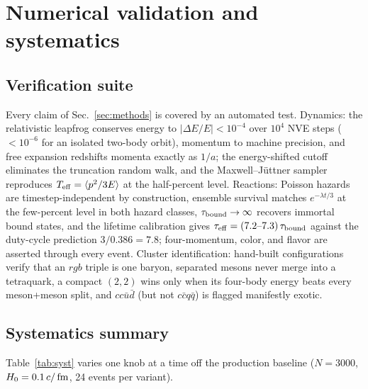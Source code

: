 \section{Numerical validation and systematics}
\label{app:validation}

\subsection{Verification suite}

Every claim of Sec.~\ref{sec:methods} is covered by an automated test.
Dynamics: the relativistic leapfrog conserves energy to
$|\Delta E/E|<10^{-4}$ over $10^4$ NVE steps ($<10^{-6}$ for an
isolated two-body orbit), momentum to machine precision, and free
expansion redshifts momenta exactly as $1/a$; the energy-shifted
cutoff eliminates the truncation random walk, and the
Maxwell--J\"uttner sampler reproduces $T_{\mathrm{eff}}=\langle p^2/3E\rangle$ at
the half-percent level.  Reactions: Poisson hazards are
timestep-independent by construction, ensemble survival matches
$e^{-\lambda t/3}$ at the few-percent level in both hazard classes,
$\tau_{\rm bound}\to\infty$ recovers immortal bound states, and the
lifetime calibration gives
$\tau_{\rm eff}=(7.2\text{--}7.3)\,\tau_{\rm bound}$ against the
duty-cycle prediction $3/0.386=7.8$; four-momentum, color, and flavor
are asserted through every event.  Cluster identification: hand-built
configurations verify that an $rgb$ triple is one baryon, separated
mesons never merge into a tetraquark, a compact $(2,2)$ wins only when
its four-body energy beats every meson+meson split, and
$cc\bar u\bar d$ (but not $c\bar c q\bar q$) is flagged manifestly
exotic.

\subsection{Systematics summary}

Table~\ref{tab:syst} varies one knob at a time off the production
baseline ($N=3000$, $H_0=0.1\,c/\,\mathrm{fm}$, 24 events per variant).

